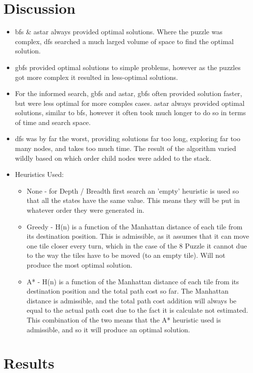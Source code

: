 \documentclass[12pt]{article}
\begin{document}
\section{Discussion}
\begin{itemize}
	\item bfs \& astar always provided optimal solutions. Where the puzzle was complex, dfs searched a much larged volume of space to find the optimal solution.
	\item gbfs provided optimal solutions to simple problems, however as the puzzles got more complex it resulted in less-optimal solutions.
	\item For the informed search, gbfs and astar, gbfs often provided solution faster, but were less optimal for more comples cases. astar always provided optimal solutions, similar to bfs, however it often took much longer to do so in terms of time and search space.
	\item dfs was by far the worst, providing solutions far too long, exploring far too many nodes, and takes too much time. The result of the algorithm varied wildly based on which order child nodes were added to the stack.
	\item Heuristics Used:
	\begin{itemize}
		\item None - for Depth / Breadth first search an 'empty' heuristic is used so that all the states have the same value. This means they will be put in whatever order they were generated in.
		\item Greedy - H(n) is a function of the Manhattan distance of each tile from its destination position. This is admissible, as it assumes that it can move one tile closer every turn, which in the case of the 8 Puzzle it cannot due to the way the tiles have to be moved (to an empty tile). Will not produce the most optimal solution.
		\item A* - H(n) is a function of the Manhattan distance of each tile from its destination position and the total path cost so far. The Manhattan distance is admissible, and the total path cost addition will always be equal to the actual path cost due to the fact it is calculate not estimated. This combination of the two means that the A* heuristic used is admissible, and so it will produce an optimal solution.
	\end{itemize}
\end{itemize}

\section{Results}
\end{document}
